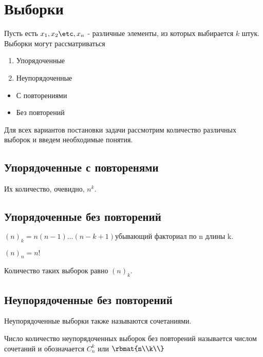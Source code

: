\documentclass[unicode, 10pt, a4paper, oneside, fleqn]{article}
\begin{document}
\section{Выборки}
Пусть есть $\set[x]{n}$ - различные элементы, из которых выбирается $k$ штук.
Выборки могут рассматриваться\par
\begin{enumerate}
  \item Упорядоченные
  \item Неупорядоченные
\end{enumerate}
\begin{itemize}
  \item С повторениями
  \item Без повторений
\end{itemize}
Для всех вариантов постановки задачи рассмотрим количество различных выборок и
введем необходимые понятия.
\subsection{Упорядоченные с повторенями}
Их количество, очевидно, $n^k$.
\subsection{Упорядоченные без повторений}
\begin{df}
  $\displaystyle (n)_k=n(n-1)\ldots(n-k+1) \text{убывающий факториал по n длины k.}$
\end{df}
\begin{note}
  $\displaystyle (n)_n=n!$
\end{note}
Количество таких выборок равно $(n)_k$.
\subsection{Неупорядоченные без повторений}
\begin{note}
  Неупорядоченные выборки также называются сочетаниями.
\end{note}
\begin{df}
  Число количество неупорядоченных выборок без повторений называется числом сочетаний 
  и обозначается $C_n^k$ или $\rbmat{n\\k\\}$
\end{df}
\end{document}
